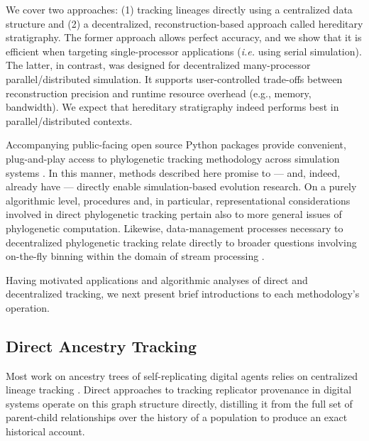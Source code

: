 
We cover two approaches: (1) tracking lineages directly using a centralized data structure and (2) a decentralized, reconstruction-based approach called hereditary stratigraphy.
The former approach allows perfect accuracy, and we show that it is efficient when targeting single-processor applications (\textit{i.e.} using serial simulation).
The latter, in contrast, was designed for decentralized many-processor parallel/distributed simulation.
It supports user-controlled trade-offs between reconstruction precision and runtime resource overhead (e.g., memory, bandwidth).
We expect that hereditary stratigraphy indeed performs best in parallel/distributed contexts.

Accompanying public-facing open source Python packages provide convenient, plug-and-play access to phylogenetic tracking methodology across simulation systems \citep{moreno2022hstrat,dolson2024phylotrack}.
In this manner, methods described here promise to --- and, indeed, already have --- directly enable simulation-based evolution research.
On a purely algorithmic level, procedures and, in particular, representational considerations involved in direct phylogenetic tracking pertain also to more general issues of phylogenetic computation.
Likewise, data-management processes necessary to decentralized phylogenetic tracking relate directly to broader questions involving on-the-fly binning within the domain of stream processing \citep{moreno2024algorithms}.

Having motivated applications and algorithmic analyses of direct and decentralized tracking, we next present brief introductions to each methodology's operation.

\subsection{Direct Ancestry Tracking}

Most work on ancestry trees of self-replicating digital agents relies on centralized lineage tracking \citep{friggeri2014rumor,cohen1987computer,dolson2024phylotrack}.
Direct approaches to tracking replicator provenance in digital systems operate on this graph structure directly, distilling it from the full set of parent-child relationships over the history of a population to produce an exact historical account.

